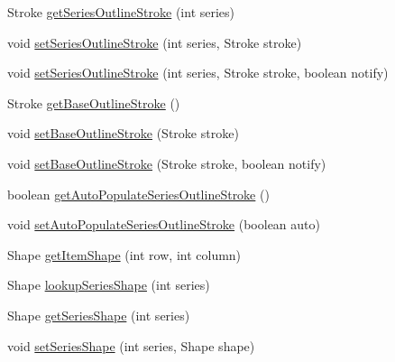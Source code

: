 \begin{DoxyCompactItemize}
\item 
Stroke \mbox{\hyperlink{classorg_1_1jfree_1_1chart_1_1renderer_1_1_abstract_renderer_a0fde5e94f100a135e55fc7fc7f53478b}{get\+Series\+Outline\+Stroke}} (int series)
\item 
void \mbox{\hyperlink{classorg_1_1jfree_1_1chart_1_1renderer_1_1_abstract_renderer_a1c87d3b5de25398fa7e6985a5bad65e4}{set\+Series\+Outline\+Stroke}} (int series, Stroke stroke)
\item 
void \mbox{\hyperlink{classorg_1_1jfree_1_1chart_1_1renderer_1_1_abstract_renderer_abf7735a23978a2b3fe1fbf54c0fc7df0}{set\+Series\+Outline\+Stroke}} (int series, Stroke stroke, boolean notify)
\item 
Stroke \mbox{\hyperlink{classorg_1_1jfree_1_1chart_1_1renderer_1_1_abstract_renderer_a8a73309c5c596b38434a7c3cbbc6f8e3}{get\+Base\+Outline\+Stroke}} ()
\item 
void \mbox{\hyperlink{classorg_1_1jfree_1_1chart_1_1renderer_1_1_abstract_renderer_a8626e74d5ba48c73c39af03b289ea7a0}{set\+Base\+Outline\+Stroke}} (Stroke stroke)
\item 
void \mbox{\hyperlink{classorg_1_1jfree_1_1chart_1_1renderer_1_1_abstract_renderer_ae9b788eee2ee4506c4fe4dd219465dbb}{set\+Base\+Outline\+Stroke}} (Stroke stroke, boolean notify)
\item 
boolean \mbox{\hyperlink{classorg_1_1jfree_1_1chart_1_1renderer_1_1_abstract_renderer_a0bee4fb1848ef723f35ddd8085c5f1ce}{get\+Auto\+Populate\+Series\+Outline\+Stroke}} ()
\item 
void \mbox{\hyperlink{classorg_1_1jfree_1_1chart_1_1renderer_1_1_abstract_renderer_a4014d0855f984a12057d5045d736fa0a}{set\+Auto\+Populate\+Series\+Outline\+Stroke}} (boolean auto)
\item 
Shape \mbox{\hyperlink{classorg_1_1jfree_1_1chart_1_1renderer_1_1_abstract_renderer_abc70953b32cbf7ddc8f37f7747e66d8c}{get\+Item\+Shape}} (int row, int column)
\item 
Shape \mbox{\hyperlink{classorg_1_1jfree_1_1chart_1_1renderer_1_1_abstract_renderer_ac5a0b8a1c0dea1813cfbbf36e7cbbd10}{lookup\+Series\+Shape}} (int series)
\item 
Shape \mbox{\hyperlink{classorg_1_1jfree_1_1chart_1_1renderer_1_1_abstract_renderer_a7e80b0a892d2634a5a925a7023c721bf}{get\+Series\+Shape}} (int series)
\item 
void \mbox{\hyperlink{classorg_1_1jfree_1_1chart_1_1renderer_1_1_abstract_renderer_a7e45f32df3421866d30c8e0c7fffe53f}{set\+Series\+Shape}} (int series, Shape shape)
\item 

\end{DoxyCompactItemize}

